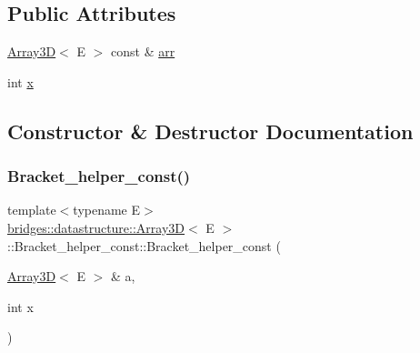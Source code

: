 \subsection*{Public Attributes}
\begin{DoxyCompactItemize}
\item 
\hyperlink{classbridges_1_1datastructure_1_1_array3_d}{Array3D}$<$ E $>$ const  \& \hyperlink{structbridges_1_1datastructure_1_1_array3_d_1_1_bracket__helper__const_afb5d187eb87a722b9e2e67f72891d01c}{arr}
\item 
int \hyperlink{structbridges_1_1datastructure_1_1_array3_d_1_1_bracket__helper__const_ae7538519eb75fa07fbd06ab9754b6727}{x}
\end{DoxyCompactItemize}


\subsection{Constructor \& Destructor Documentation}
\mbox{\label{structbridges_1_1datastructure_1_1_array3_d_1_1_bracket__helper__const_a9b87bdb88f75416d5953efe779586856}} 
\subsubsection{\texorpdfstring{Bracket\+\_\+helper\+\_\+const()}{Bracket\_helper\_const()}}
{\footnotesize\ttfamily template$<$typename E$>$ \\
\hyperlink{classbridges_1_1datastructure_1_1_array3_d}{bridges\+::datastructure\+::\+Array3D}$<$ E $>$\+::Bracket\+\_\+helper\+\_\+const\+::\+Bracket\+\_\+helper\+\_\+const (\begin{DoxyParamCaption}\item[{\hyperlink{classbridges_1_1datastructure_1_1_array3_d}{Array3D}$<$ E $>$ \&}]{a,  }\item[{int}]{x }\end{DoxyParamCaption})\hspace{0.3cm}{\ttfamily [inline]}}



